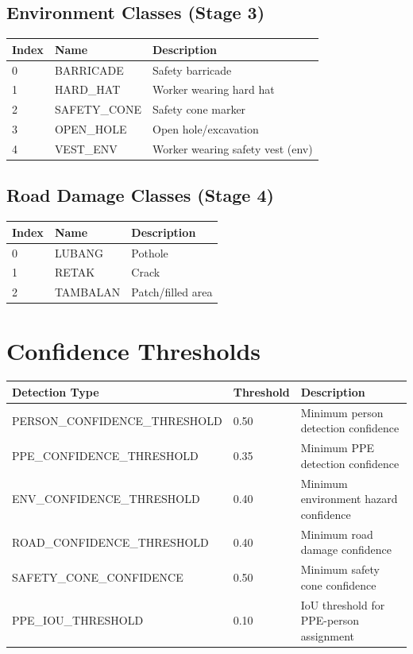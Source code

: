 \documentclass[12pt,a4paper,oneside]{book}
\begin{document}
\subsection{Environment Classes (Stage 3)}

\begin{tabular}{|l|l|l|}
    \hline
    \textbf{Index} & \textbf{Name} & \textbf{Description} \\
    \hline
    0 & BARRICADE & Safety barricade \\
    \hline
    1 & HARD\_HAT & Worker wearing hard hat \\
    \hline
    2 & SAFETY\_CONE & Safety cone marker \\
    \hline
    3 & OPEN\_HOLE & Open hole/excavation \\
    \hline
    4 & VEST\_ENV & Worker wearing safety vest (env) \\
    \hline
\end{tabular}

\subsection{Road Damage Classes (Stage 4)}

\begin{tabular}{|l|l|l|}
    \hline
    \textbf{Index} & \textbf{Name} & \textbf{Description} \\
    \hline
    0 & LUBANG & Pothole \\
    \hline
    1 & RETAK & Crack \\
    \hline
    2 & TAMBALAN & Patch/filled area \\
    \hline
\end{tabular}

\section{Confidence Thresholds}

\begin{tabular}{|l|l|l|}
    \hline
    \textbf{Detection Type} & \textbf{Threshold} & \textbf{Description} \\
    \hline
    PERSON\_CONFIDENCE\_THRESHOLD & 0.50 & Minimum person detection confidence \\
    \hline
    PPE\_CONFIDENCE\_THRESHOLD & 0.35 & Minimum PPE detection confidence \\
    \hline
    ENV\_CONFIDENCE\_THRESHOLD & 0.40 & Minimum environment hazard confidence \\
    \hline
    ROAD\_CONFIDENCE\_THRESHOLD & 0.40 & Minimum road damage confidence \\
    \hline
    SAFETY\_CONE\_CONFIDENCE & 0.50 & Minimum safety cone confidence \\
    \hline
    PPE\_IOU\_THRESHOLD & 0.10 & IoU threshold for PPE-person assignment \\
    \hline
\end{tabular}
\end{document}

